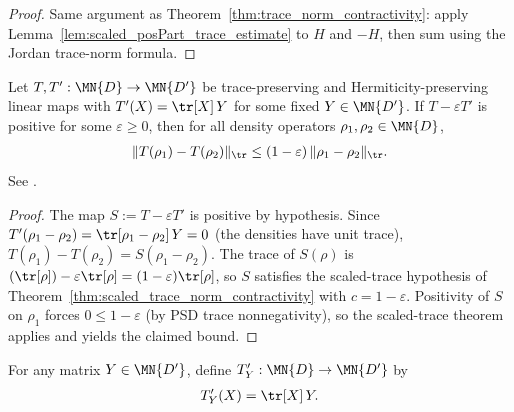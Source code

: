 \begin{proof}\leanok
    Same argument as Theorem~\ref{thm:trace_norm_contractivity}: apply
    Lemma~\ref{lem:scaled_posPart_trace_estimate} to $H$ and $-H$, then
    sum using the Jordan trace-norm formula.
\end{proof}

\begin{theorem}
    \label{thm:quantum_doeblin_contraction}
    \leanok
    Let $T,T':\MN{D}\to\MN{D'}$ be trace-preserving and
    Hermiticity-preserving linear maps with
    $T'(X)=\tr[X]\,Y$ for some fixed $Y\in\MN{D'}$.
    If $T-\varepsilon T'$ is positive for some $\varepsilon\geq0$, then
    for all density operators $\rho_1,\rho_2\in\MN{D}$,
    \begin{align}
        \lVert T(\rho_1)-T(\rho_2)\rVert_{\tr}
        \leq(1-\varepsilon)\,\lVert\rho_1-\rho_2\rVert_{\tr}.
        \label{eq:quantum_doeblin_contraction}
    \end{align}
    See \cite[Chapter~8, Theorem~8.17]{Wolf2012Quantum}.
\end{theorem}

\begin{proof}\leanok
    The map $S:=T-\varepsilon T'$ is positive by hypothesis.
    Since $T'(\rho_1-\rho_2)=\tr[\rho_1-\rho_2]\,Y=0$ (the densities
    have unit trace), $T(\rho_1)-T(\rho_2)=S(\rho_1-\rho_2)$. The trace
    of $S(\rho)$ is $(\tr[\rho])-\varepsilon\tr[\rho]=(1-\varepsilon)
        \tr[\rho]$, so $S$ satisfies the scaled-trace hypothesis of
    Theorem~\ref{thm:scaled_trace_norm_contractivity} with
    $c=1-\varepsilon$. Positivity of $S$ on $\rho_1$ forces
    $0\leq1-\varepsilon$ (by PSD trace nonnegativity), so the
    scaled-trace theorem applies and yields the claimed bound.
\end{proof}

\begin{definition}
    \label{def:trace_prepare_map}
    \leanok
    For any matrix $Y\in\MN{D'}$, define
    $T'_Y:\MN{D}\to\MN{D'}$ by
    \begin{align}
        T'_Y(X) = \tr[X]\,Y.
        \label{eq:trace_prepare_map}
    \end{align}
\end{definition}

